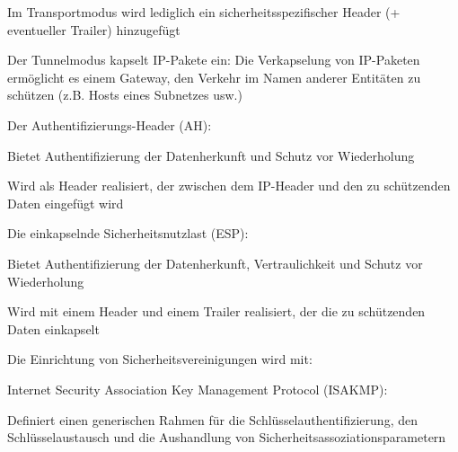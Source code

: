 \documentclass[a4paper]{article}
\begin{document}
\begin{multicols}{3}
      Im Transportmodus wird lediglich ein sicherheitsspezifischer Header (+ eventueller Trailer) hinzugefügt
      \begin{itemize*} %
            \item Der Tunnelmodus kapselt IP-Pakete ein: Die Verkapselung von IP-Paketen ermöglicht es einem Gateway, den Verkehr im Namen anderer Entitäten zu schützen (z.B. Hosts eines Subnetzes usw.)
            \item Der Authentifizierungs-Header (AH):
            \begin{itemize*}
                  \item Bietet Authentifizierung der Datenherkunft und Schutz vor Wiederholung
                  \item Wird als Header realisiert, der zwischen dem IP-Header und den zu schützenden Daten eingefügt wird
            \end{itemize*}
            \item Die einkapselnde Sicherheitsnutzlast (ESP):
            \begin{itemize*}
                  \item Bietet Authentifizierung der Datenherkunft, Vertraulichkeit und Schutz vor Wiederholung
                  \item Wird mit einem Header und einem Trailer realisiert, der die zu schützenden Daten einkapselt
            \end{itemize*}
            \item Die Einrichtung von Sicherheitsvereinigungen wird mit:
            \begin{itemize*}
                  \item Internet Security Association Key Management Protocol (ISAKMP):
                  \begin{itemize*}
                        \item Definiert einen generischen Rahmen für die Schlüsselauthentifizierung, den Schlüsselaustausch und die Aushandlung von Sicherheitsassoziationsparametern

\end{itemize*}
\end{itemize*}
\end{itemize*}
\end{multicols}
\end{document}
